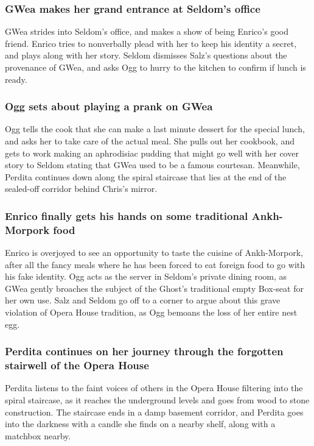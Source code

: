 \subsubsection{\Gls{GWea} makes her grand entrance at \Gls{Seldom}'s office}
\Gls{GWea} strides into \Gls{Seldom}'s office, and makes a show of being \Gls{Enrico}'s good
friend. \Gls{Enrico} tries to nonverbally plead with her to keep his identity a secret, and plays
along with her story. \Gls{Seldom} dismisses \Gls{Salz}'s questions about the provenance of
\Gls{GWea}, and asks \Gls{Ogg} to hurry to the kitchen to confirm if lunch is ready.

\subsubsection{\Gls{Ogg} sets about playing a prank on \Gls{GWea}}
\Gls{Ogg} tells the cook that she can make a last minute dessert for the special lunch, and asks
her to take care of the actual meal. She pulls out her cookbook, and gets to work making an
aphrodisiac pudding that might go well with her cover story to \Gls{Seldom} stating that \Gls{GWea}
used to be a famous courtesan. Meanwhile, \Gls{Perdita} continues down along the spiral staircase
that lies at the end of the sealed-off corridor behind \Gls{Chris}'s mirror.

\subsubsection{\Gls{Enrico} finally gets his hands on some traditional Ankh-Morpork food}
\Gls{Enrico} is overjoyed to see an opportunity to taste the cuisine of Ankh-Morpork, after all the
fancy meals where he has been forced to eat foreign food to go with his fake identity. \Gls{Ogg}
acts as the server in \Gls{Seldom}'s private dining room, as \Gls{GWea} gently broaches the subject
of the \Gls{Ghost}'s traditional empty Box-seat for her own use. \Gls{Salz} and \Gls{Seldom} go off
to a corner to argue about this grave violation of Opera House tradition, as \Gls{Ogg} bemoans the
loss of her entire nest egg.

\subsubsection{\Gls{Perdita} continues on her journey through the forgotten stairwell of the Opera
    House}
\Gls{Perdita} listens to the faint voices of others in the Opera House filtering into the spiral
staircase, as it reaches the underground levels and goes from wood to stone construction. The
staircase ends in a damp basement corridor, and \Gls{Perdita} goes into the darkness with a candle
she finds on a nearby shelf, along with a matchbox nearby.

